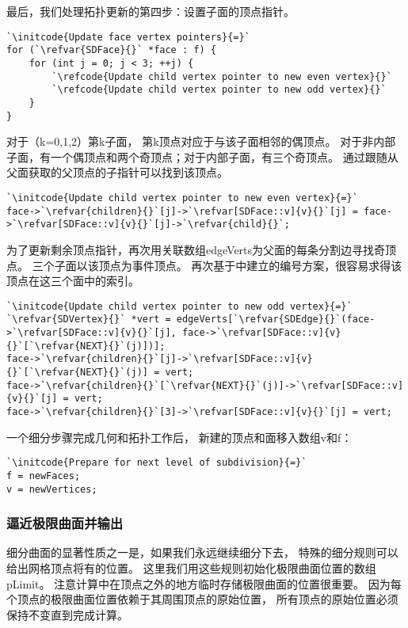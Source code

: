 最后，我们处理拓扑更新的第四步：设置子面的顶点指针。
\begin{lstlisting}
`\initcode{Update face vertex pointers}{=}`
for (`\refvar{SDFace}{}` *face : f) {
    for (int j = 0; j < 3; ++j) {
        `\refcode{Update child vertex pointer to new even vertex}{}`
        `\refcode{Update child vertex pointer to new odd vertex}{}`
    }
}
\end{lstlisting}

对于（{\ttfamily k}=0,1,2）第{\ttfamily k}子面，
第{\ttfamily k}顶点对应于与该子面相邻的偶顶点。
对于非内部子面，有一个偶顶点和两个奇顶点；对于内部子面，有三个奇顶点。
通过跟随从父面获取的父顶点的子指针可以找到该顶点。
\begin{lstlisting}
`\initcode{Update child vertex pointer to new even vertex}{=}`
face->`\refvar{children}{}`[j]->`\refvar[SDFace::v]{v}{}`[j] = face->`\refvar[SDFace::v]{v}{}`[j]->`\refvar{child}{}`;
\end{lstlisting}

为了更新剩余顶点指针，再次用关联数组{\ttfamily edgeVerts}为父面的每条分割边寻找奇顶点。
三个子面以该顶点为事件顶点。
再次基于中建立的编号方案，很容易求得该顶点在这三个面中的索引。
\begin{lstlisting}
`\initcode{Update child vertex pointer to new odd vertex}{=}`
`\refvar{SDVertex}{}` *vert = edgeVerts[`\refvar{SDEdge}{}`(face->`\refvar[SDFace::v]{v}{}`[j], face->`\refvar[SDFace::v]{v}{}`[`\refvar{NEXT}{}`(j)])];
face->`\refvar{children}{}`[j]->`\refvar[SDFace::v]{v}{}`[`\refvar{NEXT}{}`(j)] = vert;
face->`\refvar{children}{}`[`\refvar{NEXT}{}`(j)]->`\refvar[SDFace::v]{v}{}`[j] = vert;
face->`\refvar{children}{}`[3]->`\refvar[SDFace::v]{v}{}`[j] = vert;
\end{lstlisting}

一个细分步骤完成几何和拓扑工作后，
新建的顶点和面移入数组{\ttfamily v}和{\ttfamily f}：
\begin{lstlisting}
`\initcode{Prepare for next level of subdivision}{=}`
f = newFaces;
v = newVertices;
\end{lstlisting}

\subsubsection*{逼近极限曲面并输出}
细分曲面的显著性质之一是，如果我们永远继续细分下去，
特殊的细分规则可以给出网格顶点将有的位置。
这里我们用这些规则初始化极限曲面位置的数组{\ttfamily pLimit}。
注意计算中在顶点之外的地方临时存储极限曲面的位置很重要。
因为每个顶点的极限曲面位置依赖于其周围顶点的原始位置，
所有顶点的原始位置必须保持不变直到完成计算。

